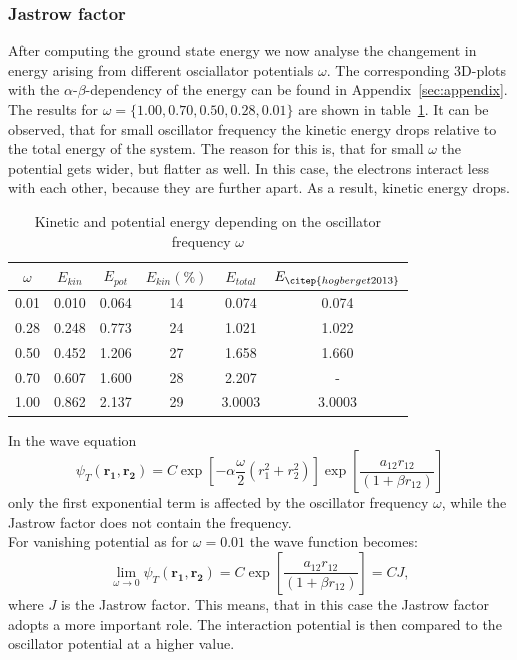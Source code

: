 \subsubsection{Jastrow factor}\label{sec:Jastro}
After computing the ground state energy we now analyse the changement in energy arising from different osciallator potentials $\omega$. The corresponding 3D-plots with the $\alpha$-$\beta$-dependency of the energy can be found in Appendix~\ref{sec:appendix}. The results for $\omega =\{1.00, 0.70, 0.50,0.28,0.01\}$ are shown in table~\ref{tab:omega}. It can be observed, that for small oscillator frequency the kinetic energy drops relative to the total energy of the system. The reason for this is, that for small $\omega$ the potential gets wider, but flatter as well. In this case, the electrons interact less with each other, because they are further apart. As a result, kinetic energy drops.\\
\begin{table}[H]
\centering
\caption{Kinetic and potential energy depending on the oscillator frequency $\omega$}
    \begin{tabular}{c|cc|c|c|c}
   \toprule
    $\omega$ & $E_{kin}$  & $E_{pot}$  & $E_{kin} (\%)$ & $E_{total}$ & $E_{\citep{hogberget2013}}$ \\ 
    \midrule
    0.01   & 0.010 & 0.064 & 14   & 0.074    & 0.074   \\
    0.28   & 0.248  & 0.773  & 24   & 1.021   & 1.022  \\
    0.50    & 0.452  & 1.206   & 27   & 1.658  & 1.660    \\
    0.70    & 0.607  & 1.600   & 28   &  2.207    & -   \\
    1.00      & 0.862  & 2.137   & 29   & 3.0003  & 3.0003    \\
    \bottomrule
    \end{tabular}
\label{tab:omega}
\end{table}
In the wave equation
\begin{equation}
\psi_T(\mathbf{r_1,r_2}) = C \exp\left[-\alpha\frac{\omega}{2} (r_1^2+r_2^2)\right] \exp \left[ \frac{a_{12} r_{12}}{(1+\beta r_{12})} \right]
\end{equation}
only the first exponential term is affected by the oscillator frequency $\omega$, while the Jastrow factor does not contain the frequency.\\
For vanishing potential as for $\omega =0.01$ the wave function becomes:
\begin{equation}
\lim_{\omega\rightarrow 0} \psi_T(\mathbf{r_1,r_2}) = C \exp \left[ \frac{a_{12} r_{12}}{(1+\beta r_{12})} \right] = C J,
\end{equation}
where $J$ is the Jastrow factor. This means, that in this case the Jastrow factor adopts a more important role. The interaction potential is then compared to the oscillator potential at a higher value.
